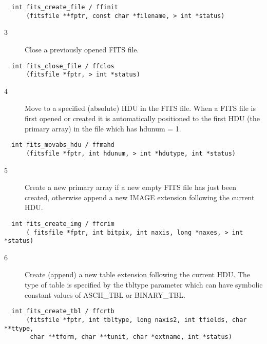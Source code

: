 \begin{verbatim}
  int fits_create_file / ffinit
      (fitsfile **fptr, const char *filename, > int *status)
\end{verbatim}

\begin{description}
\item[3 ]Close a previously opened FITS file.
\end{description}

\begin{verbatim}
  int fits_close_file / ffclos
      (fitsfile *fptr, > int *status)
\end{verbatim}

\begin{description}
\item[4 ] Move to a specified (absolute) HDU in the FITS file.  When a FITS file
    is first opened or created it is automatically positioned to the first
   HDU (the primary array) in the file which has hdunum = 1.
\end{description}

\begin{verbatim}
  int fits_movabs_hdu / ffmahd
      (fitsfile *fptr, int hdunum, > int *hdutype, int *status)
\end{verbatim}

\begin{description}
\item[5 ]Create a new primary array if a new empty FITS file has just been
  created, otherwise append a new IMAGE extension following the current HDU.
\end{description}

\begin{verbatim}
  int fits_create_img / ffcrim
      ( fitsfile *fptr, int bitpix, int naxis, long *naxes, > int *status)
\end{verbatim}

\begin{description}
\item[6 ]Create (append) a new table extension following the current HDU.
   The type of table is specified by the tbltype parameter which can have
  symbolic constant values of ASCII\_TBL or BINARY\_TBL.
\end{description}

\begin{verbatim}
  int fits_create_tbl / ffcrtb
      (fitsfile *fptr, int tbltype, long naxis2, int tfields, char **ttype,
       char **tform, char **tunit, char *extname, int *status)
\end{verbatim}


